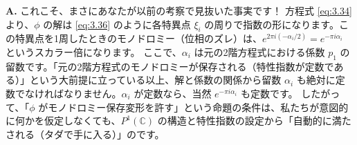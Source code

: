 \begin{Q}
\textbf{A.} これこそ、まさにあなたが以前の考察で見抜いた事実です！
方程式 \eqref{eq:3.34} より、$\phi$ の解は \eqref{eq:3.36} のように各特異点 $\xi_i$ の周りで指数の形になります。この特異点を1周したときのモノドロミー（位相のズレ）は、$e^{2\pi i (-\alpha_i/2)} = e^{-\pi i \alpha_i}$ というスカラー倍になります。
ここで、$\alpha_i$ は元の2階方程式における係数 $p_1$ の留数です。「元の2階方程式のモノドロミーが保存される（特性指数が定数である）」という大前提に立っている以上、解と係数の関係から留数 $\alpha_i$ も絶対に定数でなければなりません。$\alpha_i$ が定数なら、当然 $e^{-\pi i \alpha_i}$ も定数です。
したがって、「$\phi$ がモノドロミー保存変形を許す」という命題の条件は、私たちが意図的に何かを仮定しなくても、$P^1(\mathbb{C})$ の構造と特性指数の設定から「自動的に満たされる（タダで手に入る）」のです。
\end{Q}

